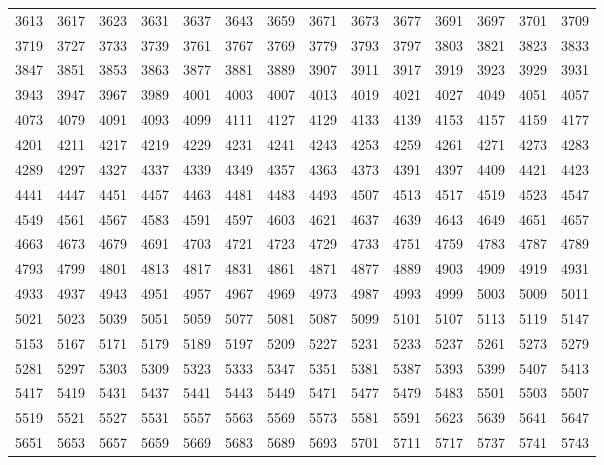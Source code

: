 \documentclass[10pt, a4paper]{article}
\begin{document}
\begin{center}
\begin{longtable}{c c c c c c c c c c c c c c}
        3613 & 3617 & 3623 & 3631 & 3637 & 3643 & 3659 & 3671 & 3673 & 3677 & 3691 & 3697 & 3701 & 3709 \\
        3719 & 3727 & 3733 & 3739 & 3761 & 3767 & 3769 & 3779 & 3793 & 3797 & 3803 & 3821 & 3823 & 3833 \\
        3847 & 3851 & 3853 & 3863 & 3877 & 3881 & 3889 & 3907 & 3911 & 3917 & 3919 & 3923 & 3929 & 3931 \\
        3943 & 3947 & 3967 & 3989 & 4001 & 4003 & 4007 & 4013 & 4019 & 4021 & 4027 & 4049 & 4051 & 4057 \\
        \hline
        4073 & 4079 & 4091 & 4093 & 4099 & 4111 & 4127 & 4129 & 4133 & 4139 & 4153 & 4157 & 4159 & 4177 \\
        4201 & 4211 & 4217 & 4219 & 4229 & 4231 & 4241 & 4243 & 4253 & 4259 & 4261 & 4271 & 4273 & 4283 \\
        4289 & 4297 & 4327 & 4337 & 4339 & 4349 & 4357 & 4363 & 4373 & 4391 & 4397 & 4409 & 4421 & 4423 \\
        4441 & 4447 & 4451 & 4457 & 4463 & 4481 & 4483 & 4493 & 4507 & 4513 & 4517 & 4519 & 4523 & 4547 \\
        4549 & 4561 & 4567 & 4583 & 4591 & 4597 & 4603 & 4621 & 4637 & 4639 & 4643 & 4649 & 4651 & 4657 \\
        4663 & 4673 & 4679 & 4691 & 4703 & 4721 & 4723 & 4729 & 4733 & 4751 & 4759 & 4783 & 4787 & 4789 \\
        4793 & 4799 & 4801 & 4813 & 4817 & 4831 & 4861 & 4871 & 4877 & 4889 & 4903 & 4909 & 4919 & 4931 \\
        4933 & 4937 & 4943 & 4951 & 4957 & 4967 & 4969 & 4973 & 4987 & 4993 & 4999 & 5003 & 5009 & 5011 \\
        5021 & 5023 & 5039 & 5051 & 5059 & 5077 & 5081 & 5087 & 5099 & 5101 & 5107 & 5113 & 5119 & 5147 \\
        5153 & 5167 & 5171 & 5179 & 5189 & 5197 & 5209 & 5227 & 5231 & 5233 & 5237 & 5261 & 5273 & 5279 \\
        \hline
        5281 & 5297 & 5303 & 5309 & 5323 & 5333 & 5347 & 5351 & 5381 & 5387 & 5393 & 5399 & 5407 & 5413 \\
        5417 & 5419 & 5431 & 5437 & 5441 & 5443 & 5449 & 5471 & 5477 & 5479 & 5483 & 5501 & 5503 & 5507 \\
        5519 & 5521 & 5527 & 5531 & 5557 & 5563 & 5569 & 5573 & 5581 & 5591 & 5623 & 5639 & 5641 & 5647 \\
        5651 & 5653 & 5657 & 5659 & 5669 & 5683 & 5689 & 5693 & 5701 & 5711 & 5717 & 5737 & 5741 & 5743 \\

\end{longtable}
\end{center}
\end{document}
